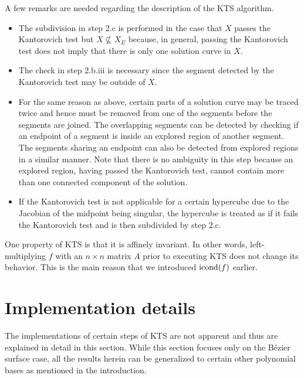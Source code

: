 \documentclass{article}
\newcommand{\icond}[1]{\mathop{\rm{icond}}(#1)}
\begin{document}
A few remarks are needed regarding the description of the KTS
algorithm.
\begin{itemize}
\item The subdivision in step 2.c is performed in the case that
$X$ passes the Kantorovich test but $X \not\subseteq X_E$ because,
in general, passing the Kantorovich test does not imply that there
is only one solution curve in $X$.

\item The check in step 2.b.iii is necessary since the segment detected
by the Kantorovich test may be outside of $X$.

\item For the same reason as above, certain parts of a solution curve may be traced twice and hence must be removed
from one of the segments before the segments are joined.  The
overlapping segments can be detected by checking if an endpoint of
a segment is inside an explored region of another segment.  The
segments sharing an endpoint can also be detected from explored
regions in a similar manner.  Note that there is no ambiguity in this
step because an explored region, having passed the Kantorovich test,
cannot contain more than one connected component of the solution.

\item If the Kantorovich test is not applicable for a certain
hypercube due to the Jacobian of the midpoint being singular, the
hypercube is treated as if it fails the Kantorovich test and is then subdivided by step 2.c.
\end{itemize}

One property of KTS is that it is affinely invariant.  In other
words, left-multiplying $f$ with an $n \times n$ matrix $A$ prior to
executing KTS does not change its behavior. This is the main
reason that we introduced $\icond{f}$ earlier.




\section{Implementation details}
\label{sec:impdetails}

The implementations of certain steps of KTS are not apparent and thus
are explained in detail in this section.  While this
section focuses only on the B\'{e}zier surface case,
all the results herein can be generalized to certain other polynomial
bases as mentioned in the introduction.
\end{document}
